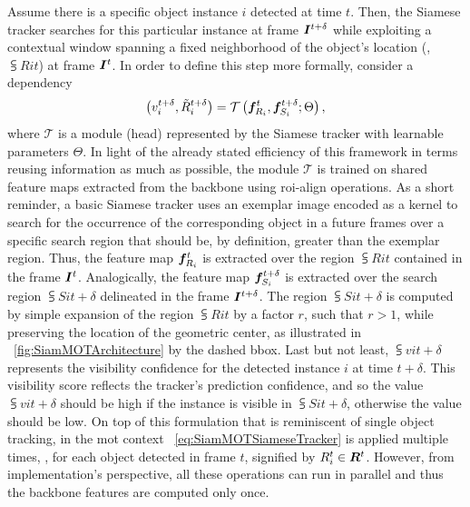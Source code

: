 Assume there is a specific object instance $i$ detected at time $t$. Then, the Siamese tracker searches for this particular instance at frame $\bm{I}^{t + \delta}$ while exploiting a contextual window spanning a fixed neighborhood of the object's location (\ietext{}, $\subsup{R}{i}{t}$) at frame $\bm{I}^{t}$. In order to define this step more formally, consider a dependency
\begin{equation}
    \label{eq:SiamMOTSiameseTracker}
    \left( {
        {v}_{i}^{t + \delta},
        {\tilde{R}}_{i}^{t + \delta}
    } \right) =
    {\mathcal{T}} \left( 
        \bm{f}_{R_i}^{t}, \bm{f}_{S_i}^{t + \delta}; \Theta
     \right),
\end{equation}
where $\mathcal{T}$ is a module (head) represented by the Siamese tracker with learnable parameters $\Theta$. In light of the already stated efficiency of this framework in terms reusing information as much as possible, the module $\mathcal{T}$ is trained on shared feature maps extracted from the backbone using \gls{roi}-align operations. As a short reminder, a basic Siamese tracker uses an exemplar image encoded as a kernel to search for the occurrence of the corresponding object in a future frames over a specific search region that should be, by definition, greater than the exemplar region. Thus, the feature map $\bm{f}_{R_i}^{t}$ is extracted over the region $\subsup{R}{i}{t}$ contained in the frame $\bm{I}^{t}$. Analogically, the feature map $\bm{f}_{S_i}^{t + \delta}$ is extracted over the search region $\subsup{S}{i}{t + \delta}$ delineated in the frame $\bm{I}^{t + \delta}$. The region $\subsup{S}{i}{t + \delta}$ is computed by simple expansion of the region $\subsup{R}{i}{t}$ by a factor $r$, such that $r > 1$, while preserving the location of the geometric center, as illustrated in \figtext{}~\ref{fig:SiamMOTArchitecture} by the dashed \gls{bbox}. Last but not least, $\subsup{v}{i}{t + \delta}$ represents the visibility confidence for the detected instance $i$ at time $t + \delta$. This visibility score reflects the tracker's prediction confidence, and so the value $\subsup{v}{i}{t + \delta}$ should be high if the instance is visible in $\subsup{S}{i}{t + \delta}$, otherwise the value should be low. On top of this formulation that is reminiscent of single object tracking, in the \gls{mot} context \eqtext{}~\ref{eq:SiamMOTSiameseTracker} is applied multiple times, \ietext{}, for each object detected in frame $t$, signified by ${R}_{i}^{t} \in \bm{R}^{t}$. However, from implementation's perspective, all these operations can run in parallel and thus the backbone features are computed only once.

